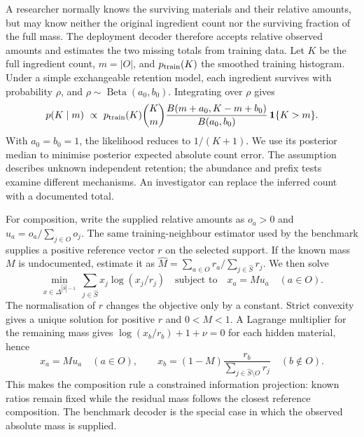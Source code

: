 A researcher normally knows the surviving materials and their relative amounts, but may know neither the original ingredient count nor the surviving fraction of the full mass. The deployment decoder therefore accepts relative observed amounts and estimates the two missing totals from training data. Let $K$ be the full ingredient count, $m=|O|$, and $p_{\rm train}(K)$ the smoothed training histogram. Under a simple exchangeable retention model, each ingredient survives with probability $\rho$, and $\rho\sim\operatorname{Beta}(a_0,b_0)$. Integrating over $\rho$ gives
\begin{equation}
p(K\mid m)\ \propto\ p_{\rm train}(K)\binom Km
\frac{B(m+a_0,K-m+b_0)}{B(a_0,b_0)}\,\mathbf1\{K>m\}.
\label{eq:unknown-retention}
\end{equation}
With $a_0=b_0=1$, the likelihood reduces to $1/(K+1)$. We use its posterior median to minimise posterior expected absolute count error. The assumption describes unknown independent retention; the abundance and prefix tests examine different mechanisms. An investigator can replace the inferred count with a documented total.

For composition, write the supplied relative amounts as $o_a>0$ and $u_a=o_a/\sum_{j\in O}o_j$. The same training-neighbour estimator used by the benchmark supplies a positive reference vector $r$ on the selected support. If the known mass $M$ is undocumented, estimate it as $\widehat M=\sum_{a\in O}r_a/\sum_{j\in\widehat S}r_j$. We then solve
\begin{equation}
\min_{x\in\Delta^{|\widehat S|-1}}\ \sum_{j\in\widehat S}x_j\log(x_j/r_j)
\quad\text{subject to}\quad x_a=M u_a\quad(a\in O).
\label{eq:kl-projection}
\end{equation}
The normalisation of $r$ changes the objective only by a constant. Strict convexity gives a unique solution for positive $r$ and $0<M<1$. A Lagrange multiplier for the remaining mass gives $\log(x_b/r_b)+1+\nu=0$ for each hidden material, hence
\begin{equation}
x_a=M u_a\quad(a\in O),\qquad
x_b=(1-M)\frac{r_b}{\sum_{j\in\widehat S\setminus O}r_j}\quad(b\notin O).
\label{eq:kl-solution}
\end{equation}
This makes the composition rule a constrained information projection: known ratios remain fixed while the residual mass follows the closest reference composition. The benchmark decoder is the special case in which the observed absolute mass is supplied.

